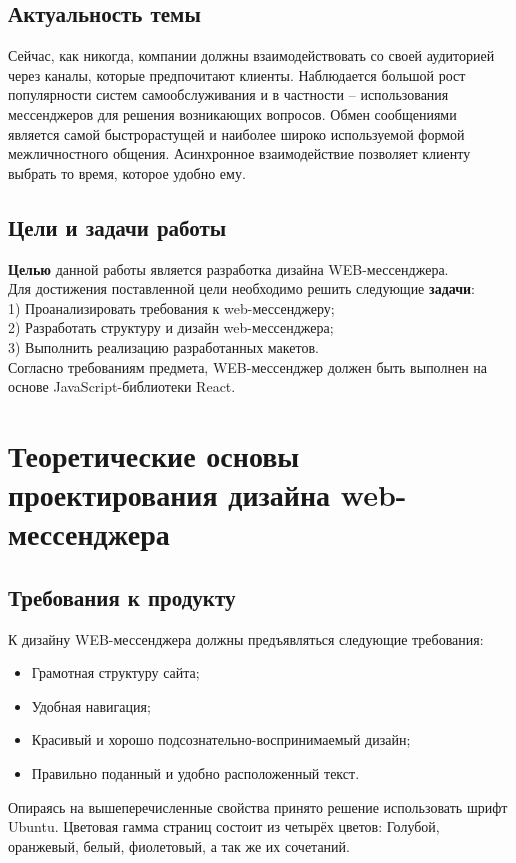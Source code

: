 \documentclass[14pt,final]{report}
\begin{document}
\section*{Актуальность темы}
Сейчас, как никогда, компании должны взаимодействовать со своей аудиторией через каналы, которые предпочитают клиенты. Наблюдается большой рост популярности систем самообслуживания и в частности – использования мессенджеров для решения возникающих вопросов. Обмен сообщениями является самой быстрорастущей и наиболее широко используемой формой межличностного общения. Асинхронное взаимодействие позволяет клиенту выбрать то время, которое удобно ему.\\
\section*{Цели и задачи работы}
\textbf{Целью} данной работы является разработка дизайна WEB-мессенджера.
\\
Для достижения поставленной цели необходимо решить следующие \textbf{задачи}: \\
1) Проанализировать требования к web-мессенджеру; \\
2) Разработать структуру и дизайн web-мессенджера; \\
3) Выполнить реализацию разработанных макетов. \\
\newline
Согласно требованиям предмета, WEB-мессенджер должен быть выполнен на основе
JavaScript-библиотеки React.

\chapter{Теоретические основы проектирования дизайна web-мессенджера}
\section{Требования к продукту}
К дизайну WEB-мессенджера должны предъявляться следующие требования:
\begin{itemize}
    \item Грамотная структуру сайта;
    \item Удобная навигация;
    \item Красивый и хорошо подсознательно-воспринимаемый дизайн;
    \item Правильно поданный и удобно расположенный текст.
\end{itemize}
Опираясь на вышеперечисленные свойства принято решение использовать шрифт Ubuntu.
Цветовая гамма страниц состоит из четырёх цветов: Голубой, оранжевый, белый, фиолетовый, а так же их сочетаний.
\end{document}
